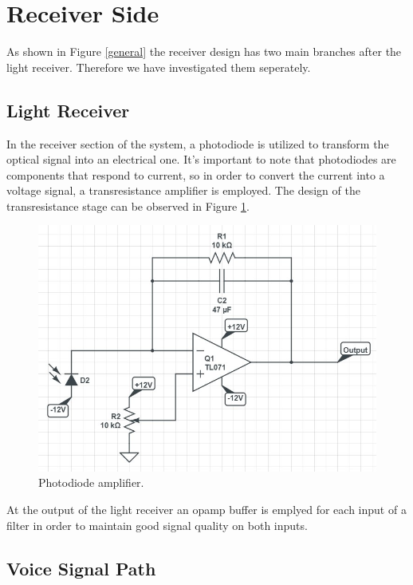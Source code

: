 \documentclass[a4paper,10pt]{IEEEtran}
\begin{document}
\section{Receiver Side}
As shown in Figure \ref{general} the receiver design has two main branches after the light receiver. Therefore we have investigated them seperately.
\subsection{Light Receiver}
In the receiver section of the system, a photodiode is utilized to transform the optical signal into an electrical one. It's important to note that photodiodes are components that respond to current, so in order to convert the current into a voltage signal, a transresistance amplifier is employed. The design of the transresistance stage can be observed in Figure \ref{photodiode}. 
\begin{figure}[htbp!]
    \centering
    \includegraphics[width = 1\linewidth]{Photodiode amplifier.jpg}
    \caption{Photodiode amplifier. }
    \label{photodiode}
\end{figure} 
At the output of the light receiver an opamp buffer is emplyed for each input of a filter in order to maintain good signal quality on both inputs.
\subsection{Voice Signal Path}
\end{document}
